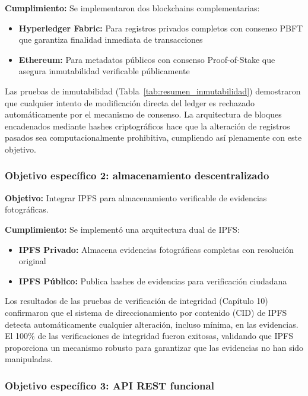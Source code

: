 \textbf{Cumplimiento:} Se implementaron dos blockchains complementarias:
\begin{itemize}
    \item \textbf{Hyperledger Fabric:} Para registros privados completos con consenso PBFT que garantiza finalidad inmediata de transacciones
    \item \textbf{Ethereum:} Para metadatos públicos con consenso Proof-of-Stake que asegura inmutabilidad verificable públicamente
\end{itemize}

Las pruebas de inmutabilidad (Tabla~\ref{tab:resumen_inmutabilidad}) demostraron que cualquier intento de modificación directa del ledger es rechazado automáticamente por el mecanismo de consenso. La arquitectura de bloques encadenados mediante hashes criptográficos hace que la alteración de registros pasados sea computacionalmente prohibitiva, cumpliendo así plenamente con este objetivo.

\subsubsection{Objetivo específico 2: almacenamiento descentralizado}

\textbf{Objetivo:} Integrar IPFS para almacenamiento verificable de evidencias fotográficas.

\textbf{Cumplimiento:} Se implementó una arquitectura dual de IPFS:
\begin{itemize}
    \item \textbf{IPFS Privado:} Almacena evidencias fotográficas completas con resolución original
    \item \textbf{IPFS Público:} Publica hashes de evidencias para verificación ciudadana
\end{itemize}

Los resultados de las pruebas de verificación de integridad (Capítulo 10) confirmaron que el sistema de direccionamiento por contenido (CID) de IPFS detecta automáticamente cualquier alteración, incluso mínima, en las evidencias. El 100\% de las verificaciones de integridad fueron exitosas, validando que IPFS proporciona un mecanismo robusto para garantizar que las evidencias no han sido manipuladas.

\subsubsection{Objetivo específico 3: API REST funcional}


